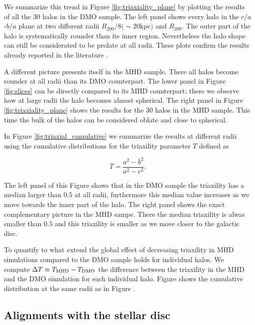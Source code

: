 \documentclass[usenatbib]{mnras}
\begin{document}
We summarize this trend in Figure \ref{fig:triaxiality_plane} by
plotting the results of all the 30 halos in the DMO sample.
The left panel shows every halo in the $c/a$-$b/a$ plane at
two different radii $R_{200}/8 (\sim 20$kpc$)$ and $R_{200}$. 
The outer part of the halo is systematically rounder than its inner
region. 
Nevertheless the halo shape can still be considerated to be prolate at
all radii. 
These plots confirm the results already reported in the
literature \citep{VeraCiro11}.

A different picture presents itself in the MHD sample.
There all halos become rounder at all radii than its DMO
counterpart.
The lower panel in Figure \ref{fig:slices} can be directly compared to
its MHD counterpart; there we observe how at large radii the halo
becomes almost spherical. 
The right panel in Figure \ref{fig:triaxiality_plane} shows the
results for the 30 halos in the MHD sample.
This time the bulk of the halos can be considered oblate and close to
spherical. 

In Figure \ref{fig:triaxial_cumulative} we summarize the results at
different radii using the cumulative distributions for the 
triaxility parameter $T$ defined as 

\begin{equation}
T=\frac{a^2-b^2}{a^2-c^2}.
\label{eq:triaxiality}
\end{equation}

The left panel of this Figure shows that in the DMO sample the
triaxility has a median larger than $0.5$ at all radii, furthermore
this median value increases as we move towards the inner part of the
halo.
The right panel shows the exact complementary picture in the MHD
sampe.
There the median triaxility is alwas smaller than $0.5$ and this
triaxility is smaller as we move closer to the galactic disc.


To quantify to what extend the global effect of decreasing
triaxility in MHD simulations compared to the DMO sample 
holds for individual halos. 
We compute $\Delta T\equiv T_{\rm MHD}-T_{\rm DMO}$ the difference between the
triaxility in the MHD and the DMO simulation for each individual halo. 
Figure \label{fig:delta_triaxial_cumulative} shows the cumulative
distribution at the same radii as in
Figure \label{fig:delta_triaxial_cumulative}. 
    

\subsection{Alignments with the stellar disc}
\end{document}
